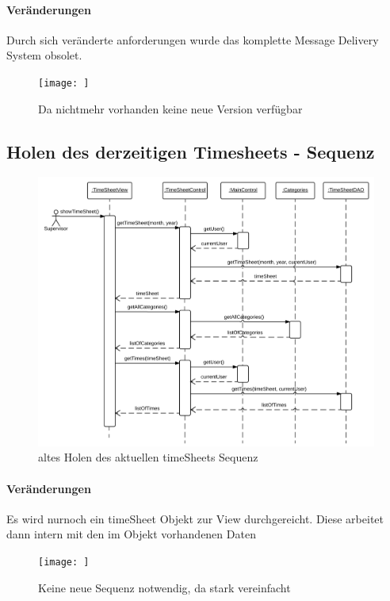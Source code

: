             \paragraph{Veränderungen}
                Durch sich veränderte anforderungen wurde das komplette Message Delivery System obsolet.
            \begin{figure}
              \centering
                \texttt{[image: ]}
               \caption{Da nichtmehr vorhanden keine neue Version verfügbar}
            \end{figure}


        \subsection{Holen des derzeitigen Timesheets - Sequenz}
            \begin{figure}
              \centering
                \includegraphics[width=\linewidth]{Get-current-timesheet.pdf}
               \caption{altes Holen des aktuellen timeSheets Sequenz}
            \end{figure}

            \paragraph{Veränderungen}
                Es wird nurnoch ein timeSheet Objekt zur View durchgereicht.
                Diese arbeitet dann intern mit den im Objekt vorhandenen Daten
            \begin{figure}
              \centering
                \texttt{[image: ]}
               \caption{Keine neue Sequenz notwendig, da stark vereinfacht}
            \end{figure}

